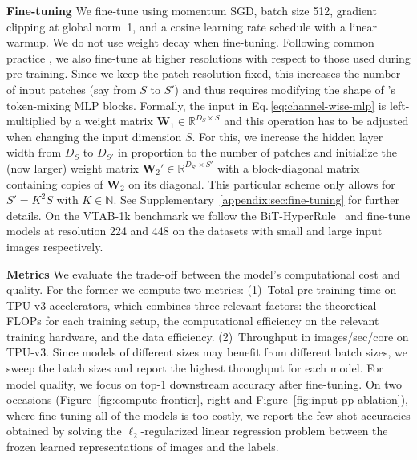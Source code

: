 {\bf Fine-tuning\;\;}
We fine-tune using momentum SGD, batch size 512,
gradient clipping at global norm~1,
and a cosine learning rate schedule with a linear warmup. 
We do not use weight decay when fine-tuning.
Following common practice \cite{kolesnikov2020-bit,touvron2019}, we also fine-tune at higher resolutions with respect to those used during pre-training.
Since we keep the patch resolution fixed, this increases the number of input patches (say from $S$ to $S'$) and thus requires modifying the shape of \name{}'s token-mixing MLP blocks.
Formally, the input in Eq.\,\eqref{eq:channel-wise-mlp} is left-multiplied by a weight matrix $\mathbf{W}_1\in\mathbb{R}^{D_S \times S}$ and this operation has to be adjusted when changing the input dimension $S$.
For this, we increase the hidden layer width from $D_S$ to $D_{S'}$ in proportion to the number of patches and initialize the (now larger) weight matrix $\mathbf{W}_2' \in \mathbb{R}^{D_{S'}\times S'}$ with a block-diagonal matrix containing copies of $\mathbf{W}_2$ on its diagonal. 
This particular scheme only allows for $S'=K^2 S$ with $K\in\mathbb{N}$.
See Supplementary~\ref{appendix:sec:fine-tuning} for further details.
On the VTAB-1k benchmark we follow the BiT-HyperRule~\cite{kolesnikov2020-bit} and fine-tune \name{} models at resolution 224 and 448 on the datasets with small and large input images respectively.

{\bf Metrics\;\;}
We evaluate the trade-off between the model's
computational cost and quality.
For the former we compute two metrics:
(1)~Total pre-training time on TPU-v3 accelerators, which combines three relevant factors: the theoretical FLOPs for each training setup, the computational efficiency on the relevant training hardware, and the data efficiency.
(2)~Throughput in images/sec/core on TPU-v3. Since models of different sizes may benefit from different batch sizes, we sweep the batch sizes
and report the highest throughput for each model.
For model quality, we focus on top-1 downstream accuracy after fine-tuning.
On two occasions (Figure~\ref{fig:compute-frontier}, right and Figure~\ref{fig:input-pp-ablation}), where fine-tuning all of the models is too costly, we report the few-shot accuracies obtained by solving the $\ell_2$-regularized linear regression problem between the frozen learned representations of images and the labels.

\newcommand{\pf}{\phantom{5}}

